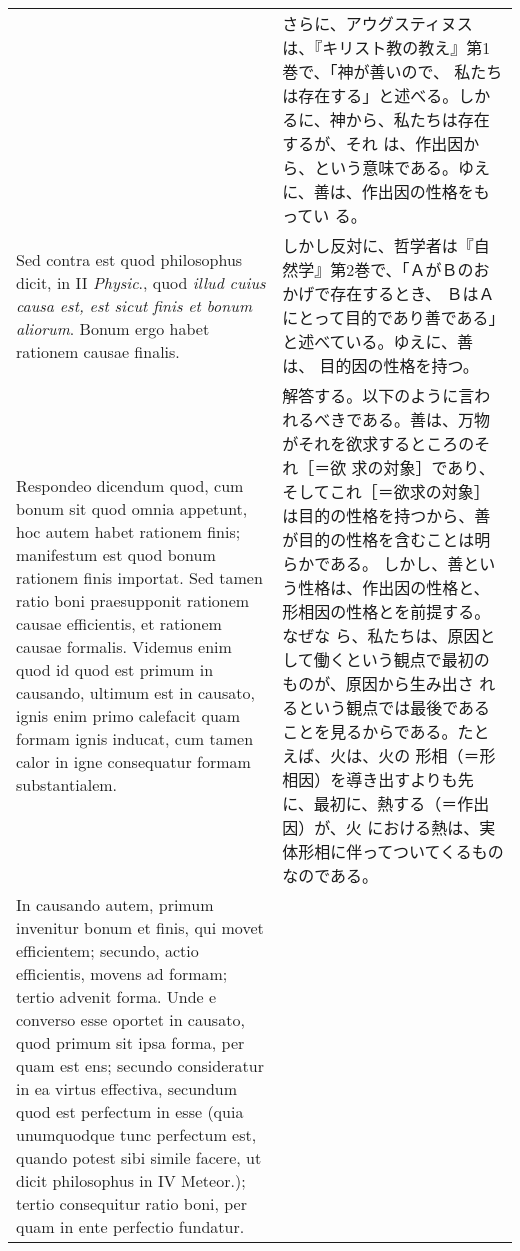 \documentclass[10pt]{jsarticle} %
\begin{document}
\begin{longtable}{p{21em}p{21em}}
&


さらに、アウグスティヌスは、『キリスト教の教え』第1巻で、「神が善いので、
 私たちは存在する」と述べる。しかるに、神から、私たちは存在するが、それ
 は、作出因から、という意味である。ゆえに、善は、作出因の性格をもってい
 る。

\\


Sed contra est quod philosophus dicit, in II {\itshape Physic}., quod
 {\itshape illud cuius causa est, est sicut finis et bonum
 aliorum}. Bonum ergo habet rationem causae finalis.

&


しかし反対に、哲学者は『自然学』第2巻で、「ＡがＢのおかげで存在するとき、
 ＢはＡにとって目的であり善である」と述べている。ゆえに、善は、
 目的因の性格を持つ。

\\


Respondeo dicendum quod, cum bonum sit quod omnia appetunt, hoc autem
 habet rationem finis; manifestum est quod bonum rationem finis
 importat. 
Sed tamen ratio boni praesupponit rationem causae efficientis, et
 rationem causae formalis. Videmus enim quod id quod est primum in
 causando, ultimum est in causato, ignis enim primo calefacit quam
 formam ignis inducat, cum tamen calor in igne consequatur formam
 substantialem. 

&


解答する。以下のように言われるべきである。善は、万物がそれを欲求するところのそれ［＝欲
 求の対象］であり、そしてこれ［＝欲求の対象］は目的の性格を持つから、善
 が目的の性格を含むことは明らかである。
しかし、善という性格は、作出因の性格と、形相因の性格とを前提する。なぜな
 ら、私たちは、原因として働くという観点で最初のものが、原因から生み出さ
 れるという観点では最後であることを見るからである。たとえば、火は、火の
 形相（＝形相因）を導き出すよりも先に、最初に、熱する（＝作出因）が、火
 における熱は、実体形相に伴ってついてくるものなのである。


\\


In causando autem, primum invenitur bonum et finis, qui movet
 efficientem; secundo, actio efficientis, movens ad formam; tertio
 advenit forma. 
Unde e converso esse oportet in causato, quod primum sit ipsa forma, per
 quam est ens; secundo consideratur in ea virtus effectiva, secundum
 quod est perfectum in esse (quia unumquodque tunc perfectum est, quando
 potest sibi simile facere, ut dicit philosophus in IV Meteor.); tertio
 consequitur ratio boni, per quam in ente perfectio fundatur.


\end{longtable}
\end{document}

